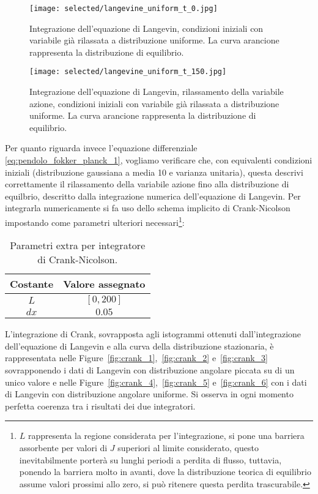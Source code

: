 \documentclass[10pt,a4paper]{article}
\begin{document}
\begin{figure}[p]
	\centering
	\texttt{[image: selected/langevine\_uniform\_t\_0.jpg]}
	\caption{Integrazione dell'equazione di Langevin, condizioni iniziali con variabile già rilassata a distribuzione uniforme. La curva arancione rappresenta la distribuzione di equilibrio.}
	\label{fig:langevin_uniform_0}
\end{figure}

\begin{figure}[p]
	\centering
	\texttt{[image: selected/langevine\_uniform\_t\_150.jpg]}
	\caption{Integrazione dell'equazione di Langevin, rilassamento della variabile azione, condizioni iniziali con variabile già rilassata a distribuzione uniforme. La curva arancione rappresenta la distribuzione di equilibrio.}
	\label{fig:langevin_uniform_150}
\end{figure}
Per quanto riguarda invece l'equazione differenziale \eqref{eq:pendolo_fokker_planck_1}, vogliamo verificare che, con equivalenti condizioni iniziali (distribuzione gaussiana a media 10 e varianza unitaria), questa descrivi correttamente il rilassamento della variabile azione fino alla distribuzione di equilbrio, descritto dalla integrazione numerica dell'equazione di Langevin. Per integrarla numericamente si fa uso dello schema implicito di Crank-Nicolson impostando come parametri ulteriori necessari\footnote{\(L\) rappresenta la regione considerata per l'integrazione, si pone una barriera assorbente per valori di \(J\) superiori al limite considerato, questo inevitabilmente porterà su lunghi periodi a perdita di flusso, tuttavia, ponendo la barriera molto in avanti, dove la distribuzione teorica di equilibrio assume valori prossimi allo zero, si può ritenere questa perdita trascurabile.}:
\begin{table}[!]
	\centering
	\begin{tabular}{cc}
	\toprule
	Costante & {Valore assegnato} \\
	\midrule
	\(L\)		& \([0,200]\)	\\
	\(dx\)		& \(0.05\)	\\
	\bottomrule
	\end{tabular}
	\caption{Parametri extra per integratore di Crank-Nicolson.}
	\label{tab:valori_2}
\end{table}
L'integrazione di Crank, sovrapposta agli istogrammi ottenuti dall'integrazione dell'equazione di Langevin e alla curva della distribuzione stazionaria, è rappresentata nelle Figure~\ref{fig:crank_1},~\ref{fig:crank_2} e~\ref{fig:crank_3} sovrapponendo i dati di Langevin con distribuzione angolare piccata su di un unico valore e nelle Figure~\ref{fig:crank_4},~\ref{fig:crank_5} e~\ref{fig:crank_6} con i dati di Langevin con distribuzione angolare uniforme. Si osserva in ogni momento perfetta coerenza tra i risultati dei due integratori.
\end{document}
